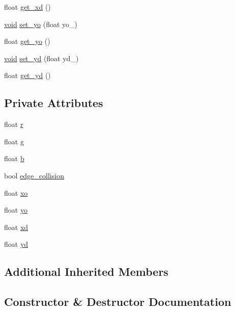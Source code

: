 \begin{DoxyCompactItemize}
\item 
float \hyperlink{classEdge__Actor_ae9a0cc7d7aab4b9cd426ee99b4ec9ebf}{get\+\_\+xd} ()
\item 
\hyperlink{imgui__impl__opengl3__loader_8h_ac668e7cffd9e2e9cfee428b9b2f34fa7}{void} \hyperlink{classEdge__Actor_a98b808c09e6697fba4d1bf0d51ba0af0}{set\+\_\+yo} (float yo\+\_\+)
\item 
float \hyperlink{classEdge__Actor_a7964c3bdf20a1928abad4ffc59fd11bd}{get\+\_\+yo} ()
\item 
\hyperlink{imgui__impl__opengl3__loader_8h_ac668e7cffd9e2e9cfee428b9b2f34fa7}{void} \hyperlink{classEdge__Actor_a0e73953b56bb2da81152e91ebb17e6ed}{set\+\_\+yd} (float yd\+\_\+)
\item 
float \hyperlink{classEdge__Actor_ab3e262e6353837f0f4e85466550450ae}{get\+\_\+yd} ()
\end{DoxyCompactItemize}
\subsection*{Private Attributes}
\begin{DoxyCompactItemize}
\item 
float \hyperlink{classEdge__Actor_a6b4d171fd575a857159d8c46faf615c8}{r}
\item 
float \hyperlink{classEdge__Actor_aa47166883466f7dd7cc7f685d8218bbc}{g}
\item 
float \hyperlink{classEdge__Actor_aac2a8e353e410854364f0e51326a367d}{b}
\item 
bool \hyperlink{classEdge__Actor_ac945cafdeac9b3f51160e7927e34ac4f}{edge\+\_\+collision}
\item 
float \hyperlink{classEdge__Actor_a17823723d52282b169bca1883f19aa99}{xo}
\item 
float \hyperlink{classEdge__Actor_a74d62448006433516df25448ec8f3cb4}{yo}
\item 
float \hyperlink{classEdge__Actor_a199cf64246d58f774a44cba9d9beb234}{xd}
\item 
float \hyperlink{classEdge__Actor_a0009e7f76e522ae46cc88279f8967205}{yd}
\end{DoxyCompactItemize}
\subsection*{Additional Inherited Members}


\subsection{Constructor \& Destructor Documentation}
\mbox{\label{classEdge__Actor_ac707b4097a2de1a388deec93ac83de98}} 
